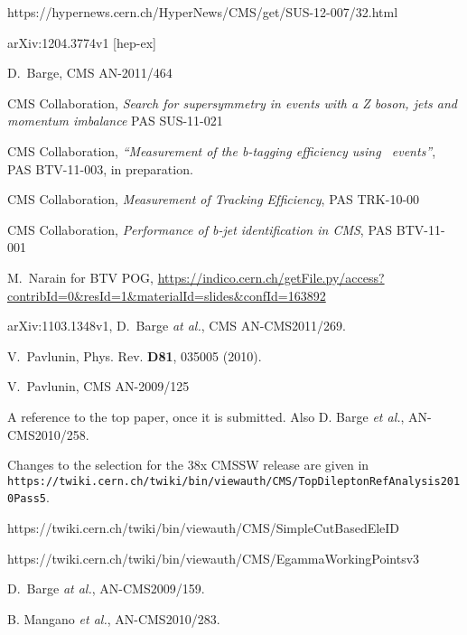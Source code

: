 \begin{thebibliography}{10}

 https://hypernews.cern.ch/HyperNews/CMS/get/SUS-12-007/32.html

 	arXiv:1204.3774v1 [hep-ex]

 D.~Barge, CMS AN-2011/464

 CMS Collaboration, {{\it Search for supersymmetry in events with a Z boson, jets and momentum imbalance}} PAS SUS-11-021

 CMS Collaboration, {{\it ``Measurement of the b-tagging efficiency using \ttbar\ events''}}, 
	PAS BTV-11-003, in preparation.

 CMS Collaboration, {{\it Measurement of Tracking Efﬁciency}}, PAS TRK-10-00

 CMS Collaboration, {{\it Performance of b-jet identification in CMS}}, PAS BTV-11-001

 M.~Narain for BTV POG, \url{https://indico.cern.ch/getFile.py/access?contribId=0&resId=1&materialId=slides&confId=163892}

 arXiv:1103.1348v1, D.~Barge {\em at al.}, CMS AN-CMS2011/269.

 V.~Pavlunin, Phys. Rev. {\bf D81}, 035005 (2010).
    
 V.~Pavlunin, CMS AN-2009/125

 A reference to the top paper, once it is submitted.  Also
D. Barge {\em et al.}, AN-CMS2010/258.  

 Changes to the selection for the 38x CMSSW release are given in 
{\tt https://twiki.cern.ch/twiki/bin/viewauth/CMS/TopDileptonRefAnalysis2010Pass5}.

 https://twiki.cern.ch/twiki/bin/viewauth/CMS/SimpleCutBasedEleID

 https://twiki.cern.ch/twiki/bin/viewauth/CMS/EgammaWorkingPointsv3

 D.~Barge {\em at al.}, AN-CMS2009/159.

 B. Mangano {\em et al.}, %
AN-CMS2010/283.


\end{thebibliography}
